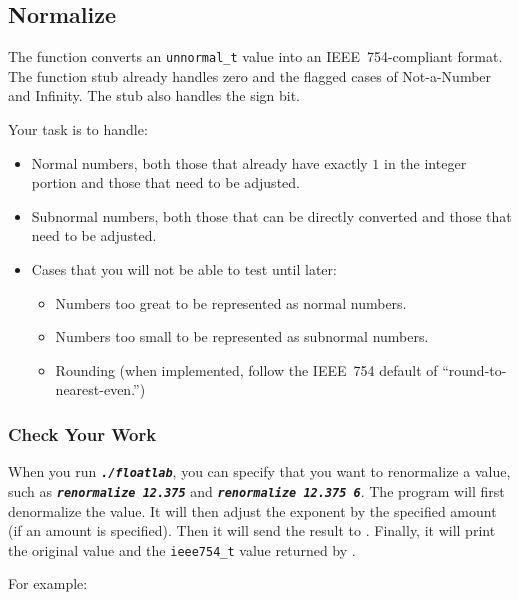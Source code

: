 \subsection{Normalize}

The  function converts an \lstinline{unnormal_t} value into an IEEE~754-compliant format.
The function stub already handles zero and the flagged cases of Not-a-Number and Infinity.
The stub also handles the sign bit.

Your task is to handle:
\begin{itemize}
    \item Normal numbers, both those that already have exactly $1$ in the integer portion and those that need to be adjusted.
    \item Subnormal numbers, both those that can be directly converted and those that need to be adjusted.
    \item Cases that you will not be able to test until later:
    \begin{itemize}
        \item Numbers too great to be represented as normal numbers.
        \item Numbers too small to be represented as subnormal numbers.
        \item Rounding (when implemented, follow the IEEE~754 default of ``round-to-nearest-even.'')
    \end{itemize}
\end{itemize}

\subsubsection*{Check Your Work}

When you run \texttt{\textbf{\textit{./floatlab}}}, you can specify that you want to renormalize a value, such as \texttt{\textbf{\textit{renormalize 12.375}}} and \texttt{\textbf{\textit{renormalize 12.375 6}}}.
The program will first denormalize the value.
It will then adjust the exponent by the specified amount (if an amount is specified).
Then it will send the result to .
Finally, it will print the original value and the \lstinline{ieee754_t} value returned by .

For example:

